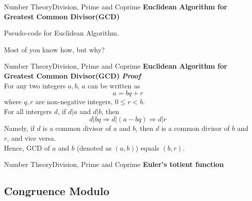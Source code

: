 \documentclass[10pt]{beamer}
\begin{document}
\begin{frame}{Number Theory}{Division, Prime and Coprime}
\textbf{\large Euclidean Algorithm for Greatest Common Divisor(GCD)}
\begin{algorithm}[H]
\begin{algorithmic}[1]
	\ELSE
	\ENDIF
\end{algorithmic}
\caption*{Pseudo-code for Euclidean Algorithm.}
\end{algorithm}

\pause
Most of you know how, but why?
\end{frame}

\begin{frame}{Number Theory}{Division, Prime and Coprime}
\textbf{\large Euclidean Algorithm for Greatest Common Divisor(GCD)}
\textbf{\sl Proof}  \\
For any two integers $a, b$, $a$ can be written as $$a = bq + r$$ where $q, r$ are non-negative integers, $0 \leq r < b$. \\ \pause
For all intergers $d$, if $d | a$ and $d | b$, then $$d|bq \Rightarrow d|(a-bq) \Rightarrow d|r$$ \pause
Namely, if $d$ is a common divisor of $a$ and $b$, then $d$ is a common divisor of $b$ and $r$, and vice versa. \\ \pause
Hence, GCD of $a$ and $b$ (denoted as $(a,b)$) equals $(b,r)$.
\end{frame}

\begin{frame}{Number Theory}{Division, Prime and Coprime}
\textbf{\large Euler's totient function}

\end{frame}


\subsection{Congruence Modulo}
\end{document}

